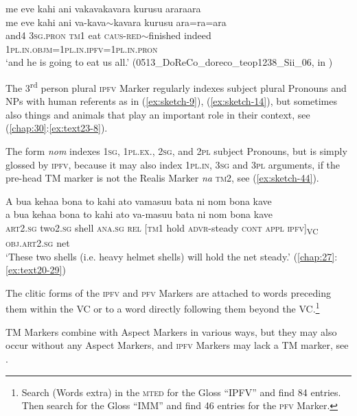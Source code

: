 \documentclass[output=paper]{langscibook}
\begin{document}
\ea\label{ex:sketch-43}
    me eve kahi ani vakavakavara kurusu araraara\\
    \gll me eve kahi ani va-kava{$\sim$}kavara kurusu ara=ra=ara\\
    and4 3\textsc{sg}.\textsc{pron} \textsc{tm}1 eat \textsc{caus}-\textsc{red}{$\sim$}finished indeed 1\textsc{pl}.\textsc{in}.\textsc{objm}=1\textsc{pl}.\textsc{in}.\textsc{ipfv}=1\textsc{pl}.\textsc{in}.\textsc{pron}\\
    \glt `and he is going to eat us all.' (0513\_DoReCo\_doreco\_teop1238\_Sii\_06, in \textcite{Mosel:2024yp})
\z

The 3\textsuperscript{rd} person plural \textsc{ipfv} Marker regularly indexes subject plural Pronouns and NPs with human referents as in (\ref{ex:sketch-9}), (\ref{ex:sketch-14}), but sometimes also things and animals that play an important role in their context, see (\ref{chap:30}:\ref{ex:text23-8}).

The form \textit{nom} indexes 1\textsc{sg}, 1\textsc{pl}.\textsc{ex}., 2\textsc{sg}, and 2\textsc{pl} subject Pronouns, but is simply glossed by \textsc{ipfv}, because it may also index 1\textsc{pl}.\textsc{in}, 3\textsc{sg} and 3\textsc{pl} arguments, if the pre-head TM marker is not the Realis Marker \textit{na} \textsc{tm}2, see (\ref{ex:sketch-44}).

\ea\label{ex:sketch-44}
    A bua kehaa bona to kahi ato vamasuu bata ni nom bona kave\\
    \gll a	bua	kehaa	bona	to	kahi	ato	va-masuu	bata	ni	nom	bona	kave\\
    \textsc{art}2.\textsc{sg}	two2.\textsc{sg}\footnotemark{}	shell	\textsc{ana}.\textsc{sg}	\textsc{rel}	[\textsc{tm}1	hold	\textsc{advr}-steady	\textsc{cont}	\textsc{appl}	\textsc{ipfv}]\textsubscript{VC}	\textsc{obj}.\textsc{art}2.\textsc{sg}	net\\
    \glt `These two shells (i.e. heavy helmet shells) will hold the net steady.' (\ref{chap:27}:\ref{ex:text20-29})
\z{}

The clitic forms of the \textsc{ipfv} and \textsc{pfv} Markers are attached to words preceding them within the VC or to a word directly following them beyond the VC.\footnote{Search (Words extra) in the \textsc{mted} for the Gloss ``IPFV'' and find 84 entries. Then search for the Gloss ``IMM'' and find 46 entries for the \textsc{pfv} Marker.}

TM Markers combine with Aspect Markers in various ways, but they may also occur without any Aspect Markers, and \textsc{ipfv} Markers may lack a TM marker, see .
\end{document}

